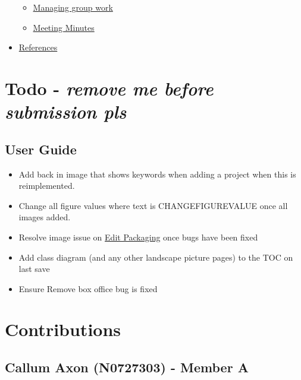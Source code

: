 \documentclass[
  english,
  a4paper,
,tablecaptionabove
]{scrartcl}
\providecommand{\tightlist}{%
  \setlength{\itemsep}{0pt}\setlength{\parskip}{0pt}}
\begin{document}
\begin{itemize}
  \begin{itemize}
  \tightlist
  \item
    \protect\hyperlink{managing-group-work}{Managing group work}
  \item
    \protect\hyperlink{meeting-minutes}{Meeting Minutes}
  \end{itemize}
\item
  \protect\hyperlink{references}{References}
\end{itemize}

\newpage

\hypertarget{todo---remove-me-before-submission-pls}{%
\section{\texorpdfstring{Todo - \textbf{\emph{remove me before
submission
pls}}}{Todo - remove me before submission pls}}\label{todo---remove-me-before-submission-pls}}

\hypertarget{user-guide}{%
\subsection{User Guide}\label{user-guide}}

\begin{itemize}
\tightlist
\item
  Add back in image that shows keywords when adding a project when this
  is reimplemented.
\item
  Change all figure values where text is CHANGEFIGUREVALUE once all
  images added.
\item
  Resolve image issue on \protect\hyperlink{edit-packaging}{Edit
  Packaging} once bugs have been fixed
\item
  Add class diagram (and any other landscape picture pages) to the TOC
  on last save
\item
  Ensure Remove box office bug is fixed
\end{itemize}

\newpage

\hypertarget{contributions}{%
\section{Contributions}\label{contributions}}

\hypertarget{callum-axon-n0727303---member-a}{%
\subsection{Callum Axon (N0727303) - Member
A}\label{callum-axon-n0727303---member-a}}
\end{document}
